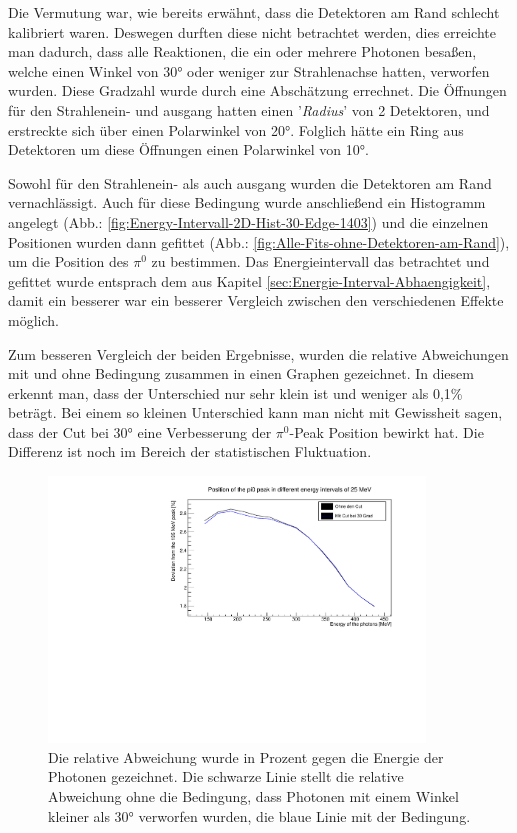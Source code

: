 \documentclass[a4paper,11pt,oneside,final,german,openbib,pdftex]{scrbook}
\begin{document}

Die Vermutung war, wie bereits erw\"ahnt, dass die Detektoren am Rand schlecht kalibriert waren. Deswegen durften diese nicht betrachtet werden, dies erreichte man dadurch, dass alle Reaktionen, die ein oder mehrere Photonen besa{\ss}en, welche einen Winkel von 30° oder weniger zur Strahlenachse hatten, verworfen wurden. Diese Gradzahl wurde durch eine Absch\"atzung errechnet. Die \"Offnungen f\"ur den Strahlenein- und ausgang hatten einen '\textit{Radius}' von 2 Detektoren, und erstreckte sich \"uber einen Polarwinkel von 20°. Folglich h\"atte ein Ring aus Detektoren um diese \"Offnungen einen Polarwinkel von 10°. 

Sowohl f\"ur den Strahlenein- als auch ausgang wurden die Detektoren am Rand vernachl\"assigt. 
Auch f\"ur diese Bedingung wurde anschlie{\ss}end ein Histogramm angelegt (Abb.: \ref{fig:Energy-Intervall-2D-Hist-30-Edge-1403}) und die einzelnen Positionen wurden dann gefittet (Abb.: \ref{fig:Alle-Fits-ohne-Detektoren-am-Rand}), um die Position des $\pi^0$ zu bestimmen. Das Energieintervall das betrachtet und gefittet wurde entsprach dem aus Kapitel \ref{sec:Energie-Interval-Abhaengigkeit}, damit ein besserer war ein besserer Vergleich zwischen den verschiedenen Effekte m\"oglich.

Zum besseren Vergleich der beiden Ergebnisse, wurden die relative Abweichungen mit und ohne Bedingung zusammen in einen Graphen gezeichnet. In diesem erkennt man, dass der Unterschied nur sehr klein ist und weniger als 0,1\% betr\"agt. Bei einem so kleinen Unterschied kann man nicht mit Gewissheit sagen, dass der Cut bei 30° eine Verbesserung der $\pi^0$-Peak Position bewirkt hat. Die Differenz ist noch im Bereich der statistischen Fluktuation. 

\begin{figure}[h!]
	\begin{center}
		\includegraphics[width=100mm]{EnergyAngleBothRelativeDeviation}
		\caption{Die relative Abweichung wurde in Prozent gegen die Energie der Photonen gezeichnet. Die schwarze Linie stellt die relative Abweichung ohne die Bedingung, dass Photonen mit einem Winkel kleiner als 30° verworfen wurden, die blaue Linie mit der Bedingung.}
	\end{center}
\end{figure}
\end{document}
